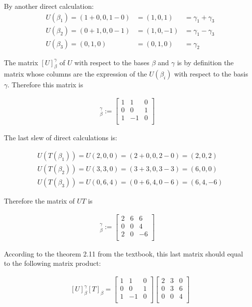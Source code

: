\documentclass[12pt]{amsart}
\begin{document}
By another direct calculation:
\begin{align*}
& U(\beta_1)= (1+0,0,1-0) &= (1,0,1) &= \gamma_1 + \gamma_3\\
& U(\beta_2)= (0+1,0,0-1) &= (1,0,-1)&= \gamma_1 - \gamma_3\\
& U(\beta_3)= (0, 1, 0)   &= (0,1,0) &= \gamma_2
\end{align*}

The matrix $[U]^{\gamma}_\beta$ of $U$ with respect to the bases $\beta$ and $\gamma$ is by definition the matrix whose columns are the expression of the $U(\beta_i)$ with respect to the basis $\gamma$.  Therefore this matrix is

\begin{align*}
[U]^{\gamma}_\beta := \begin{bmatrix}
1 & 1 & 0\\
0 & 0 & 1\\
1 & -1 & 0\\
\end{bmatrix}
\end{align*}

The last slew of direct calculations is:

\begin{align*}
& U(T(\beta_1))=U(2,0,0) = (2+0,0,2-0) = (2,0,2)\\
& U(T(\beta_2))=U(3,3,0) = (3+3,0,3-3) = (6,0,0)\\
& U(T(\beta_3))=U(0,6,4) = (0+6,4,0-6) = (6,4,-6)
\end{align*}

Therefore the matrix of $UT$ is

\begin{align*}
[UT]^{\gamma}_\beta := \begin{bmatrix}
2 & 6 & 6\\
0 & 0 & 4\\
2 & 0 & -6\\
\end{bmatrix}
\end{align*}

According to the theorem 2.11 from the textbook, this last matrix should equal to the following matrix product:

\begin{align*}
& [U]_{\beta}^{\gamma}[T]_{\beta} = \begin{bmatrix}
1 & 1 & 0\\
0 & 0 & 1\\
1 & -1 & 0\\
\end{bmatrix}\begin{bmatrix}
2 & 3 & 0\\
0 & 3 & 6\\
0 & 0 & 4\\
\end{bmatrix}\\
\end{align*}
\end{document}
